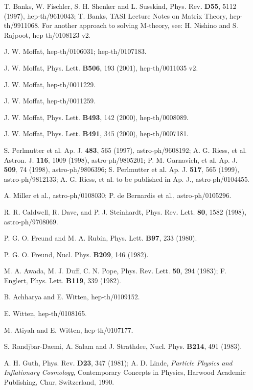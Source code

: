 \documentclass[a4paper,12pt]{article}
\begin{document}
\begin{thebibliography}{100}
 T. Banks, W. Fischler, S. H. Shenker and L.
Susskind, Phys. Rev. {\bf D55}, 5112 (1997), hep-th/9610043;
T. Banks, TASI Lecture Notes on Matrix Theory, hep-th/9911068.
For another approach to solving M-theory, see: H. Nishino and S.
Rajpoot, hep-th/0108123 v2.

 J. W. Moffat, hep-th/0106031; hep-th/0107183.

 J. W. Moffat, Phys. Lett. {\bf B506}, 193
(2001), hep-th/0011035 v2.

 J. W. Moffat, hep-th/0011229.

 J. W. Moffat, hep-th/0011259.

 J. W. Moffat, Phys. Lett. {\bf B493}, 142
(2000), hep-th/0008089.

 J. W. Moffat, Phys. Lett. {\bf B491}, 345 (2000),
hep-th/0007181.

 S. Perlmutter et al. Ap. J. {\bf 483},
565 (1997), astro-ph/9608192; A. G. Riess, et al. Astron. J. {\bf 116},
1009 (1998), astro-ph/9805201; P. M. Garnavich, et al. Ap. J. {\bf 509}, 74
(1998), astro-ph/9806396; S. Perlmutter et al. Ap. J. {\bf 517}, 565
(1999), astro-ph/9812133; A. G. Riess, et al. to be published in Ap. J.,
astro-ph/0104455.

 A. Miller et al., astro-ph/0108030; P. de Bernardis et al.,
astro-ph/0105296.

 R. R. Caldwell, R. Dave, and P. J. Steinhardt, Phys.
Rev. Lett. {\bf 80}, 1582 (1998), astro-ph/9708069.

 P. G. O. Freund and M. A. Rubin, Phys. Lett. {\bf B97},
233 (1980).

 P. G. O. Freund, Nucl. Phys. {\bf B209}, 146 (1982).

 M. A. Awada, M. J. Duff, C. N. Pope, Phys. Rev. Lett. {\bf 50},
294 (1983); F. Englert, Phys. Lett. {\bf B119}, 339 (1982).

 B. Achharya and E. Witten, hep-th/0109152.

 E. Witten, hep-th/0108165.

 M. Atiyah and E. Witten, hep-th/0107177.

 S. Randjbar-Daemi, A. Salam and J. Strathdee,
Nucl. Phys. {\bf B214}, 491 (1983).

 A. H. Guth, Phys. Rev. {\bf D23}, 347 (1981); A.
D. Linde, {\it Particle Physics and Inflationary Cosmology},
Contemporary Concepts in Physics, Harwood Academic Publishing,
Chur, Switzerland, 1990.


\end{thebibliography}
\end{document}
